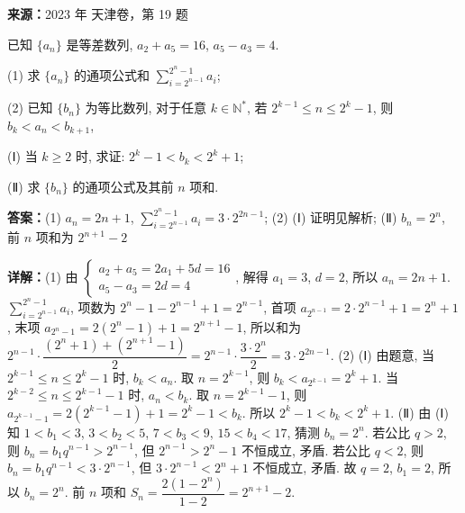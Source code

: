 \begin{question}[points=15]
\textbf{来源：}2023 年 天津卷，第 19 题\par
已知 $\{a_n\}$ 是等差数列, $a_2 + a_5 = 16$, $a_5 - a_3 = 4$.

(1) 求 $\{a_n\}$ 的通项公式和 $\displaystyle\sum_{i=2^{n-1}}^{2^n-1} a_i$;

(2) 已知 $\{b_n\}$ 为等比数列, 对于任意 $k \in \mathbb{N}^*$, 若 $2^{k-1} \le n \le 2^k - 1$, 则 $b_k < a_n < b_{k+1}$,

   (Ⅰ) 当 $k \ge 2$ 时, 求证: $2^k - 1 < b_k < 2^k + 1$;

   (Ⅱ) 求 $\{b_n\}$ 的通项公式及其前 $n$ 项和.
\begin{solution}
\textbf{答案：}(1) $a_n = 2n + 1$, $\displaystyle\sum_{i=2^{n-1}}^{2^n-1} a_i = 3 \cdot 2^{2n-1}$; (2) (Ⅰ) 证明见解析; (Ⅱ) $b_n = 2^n$, 前 $n$ 项和为 $2^{n+1} - 2$

\textbf{详解：}(1) 由 $\begin{cases} a_2 + a_5 = 2a_1 + 5d = 16 \\ a_5 - a_3 = 2d = 4 \end{cases}$, 解得 $a_1 = 3$, $d = 2$, 所以 $a_n = 2n+1$. $\displaystyle\sum_{i=2^{n-1}}^{2^n-1} a_i$, 项数为 $2^n-1 - 2^{n-1} + 1 = 2^{n-1}$, 首项 $a_{2^{n-1}} = 2\cdot2^{n-1}+1 = 2^n+1$, 末项 $a_{2^n-1} = 2(2^n-1)+1 = 2^{n+1}-1$, 所以和为 $2^{n-1} \cdot \dfrac{(2^n+1)+(2^{n+1}-1)}{2} = 2^{n-1} \cdot \dfrac{3\cdot2^n}{2} = 3 \cdot 2^{2n-1}$.
(2) (Ⅰ) 由题意, 当 $2^{k-1} \le n \le 2^k-1$ 时, $b_k < a_n$. 取 $n = 2^{k-1}$, 则 $b_k < a_{2^{k-1}} = 2^k+1$. 当 $2^{k-2} \le n \le 2^{k-1}-1$ 时, $a_n < b_k$. 取 $n = 2^{k-1}-1$, 则 $a_{2^{k-1}-1} = 2(2^{k-1}-1)+1 = 2^k-1 < b_k$. 所以 $2^k-1 < b_k < 2^k+1$.
(Ⅱ) 由 (Ⅰ) 知 $1 < b_1 < 3$, $3 < b_2 < 5$, $7 < b_3 < 9$, $15 < b_4 < 17$, 猜测 $b_n = 2^n$. 若公比 $q > 2$, 则 $b_n = b_1 q^{n-1} > 2^{n-1}$, 但 $2^{n-1} > 2^n-1$ 不恒成立, 矛盾. 若公比 $q < 2$, 则 $b_n = b_1 q^{n-1} < 3 \cdot 2^{n-1}$, 但 $3\cdot2^{n-1} < 2^n+1$ 不恒成立, 矛盾. 故 $q=2$, $b_1 = 2$, 所以 $b_n = 2^n$. 前 $n$ 项和 $S_n = \dfrac{2(1-2^n)}{1-2} = 2^{n+1} - 2$.
\end{solution}
\end{question}

